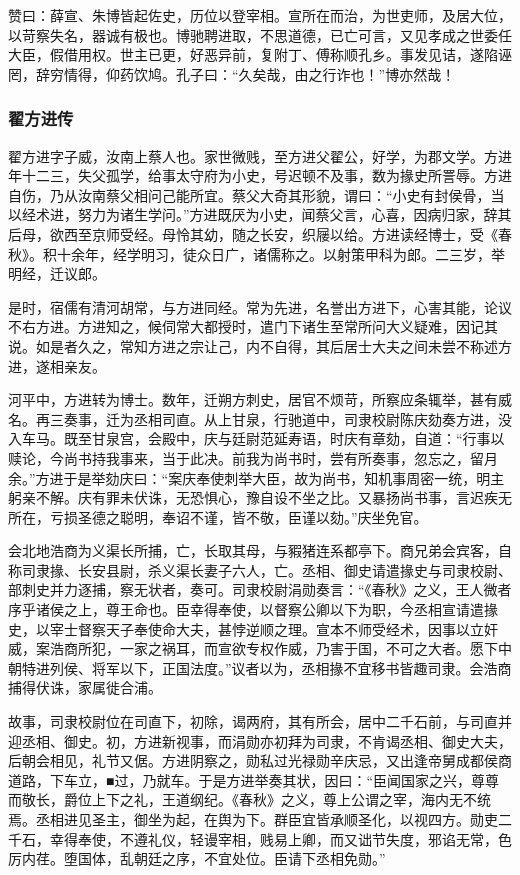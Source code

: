 \documentclass[]{article}
\begin{document}
赞曰：薛宣、朱博皆起佐史，历位以登宰相。宣所在而治，为世吏师，及居大位，以苛察失名，器诚有极也。博驰聘进取，不思道德，已亡可言，又见孝成之世委任大臣，假借用权。世主已更，好恶异前，复附丁、傅称顺孔乡。事发见诘，遂陷诬罔，辞穷情得，仰药饮鸠。孔子曰：``久矣哉，由之行诈也！''博亦然哉！

\hypertarget{header-n5719}{%
\subsubsection{翟方进传}\label{header-n5719}}

翟方进字子威，汝南上蔡人也。家世微贱，至方进父翟公，好学，为郡文学。方进年十二三，失父孤学，给事太守府为小史，号迟顿不及事，数为掾史所詈辱。方进自伤，乃从汝南蔡父相问己能所宜。蔡父大奇其形貌，谓曰：``小史有封侯骨，当以经术进，努力为诸生学问。''方进既厌为小史，闻蔡父言，心喜，因病归家，辞其后母，欲西至京师受经。母怜其幼，随之长安，织屦以给。方进读经博士，受《春秋》。积十余年，经学明习，徒众日广，诸儒称之。以射策甲科为郎。二三岁，举明经，迁议郎。

是时，宿儒有清河胡常，与方进同经。常为先进，名誉出方进下，心害其能，论议不右方进。方进知之，候伺常大都授时，遣门下诸生至常所问大义疑难，因记其说。如是者久之，常知方进之宗让己，内不自得，其后居士大夫之间未尝不称述方进，遂相亲友。

河平中，方进转为博士。数年，迁朔方刺史，居官不烦苛，所察应条辄举，甚有威名。再三奏事，迁为丞相司直。从上甘泉，行驰道中，司隶校尉陈庆劾奏方进，没入车马。既至甘泉宫，会殿中，庆与廷尉范延寿语，时庆有章劾，自道：``行事以赎论，今尚书持我事来，当于此决。前我为尚书时，尝有所奏事，忽忘之，留月余。''方进于是举劾庆曰：``案庆奉使刺举大臣，故为尚书，知机事周密一统，明主躬亲不解。庆有罪未伏诛，无恐惧心，豫自设不坐之比。又暴扬尚书事，言迟疾无所在，亏损圣德之聪明，奉诏不谨，皆不敬，臣谨以劾。''庆坐免官。

会北地浩商为义渠长所捕，亡，长取其母，与豭猪连系都亭下。商兄弟会宾客，自称司隶掾、长安县尉，杀义渠长妻子六人，亡。丞相、御史请遣掾史与司隶校尉、部刺史并力逐捕，察无状者，奏可。司隶校尉涓勋奏言：``《春秋》之义，王人微者序乎诸侯之上，尊王命也。臣幸得奉使，以督察公卿以下为职，今丞相宣请遣掾史，以宰士督察天子奉使命大夫，甚悖逆顺之理。宣本不师受经术，因事以立奸威，案浩商所犯，一家之祸耳，而宣欲专权作威，乃害于国，不可之大者。愿下中朝特进列侯、将军以下，正国法度。''议者以为，丞相掾不宜移书皆趣司隶。会浩商捕得伏诛，家属徙合浦。

故事，司隶校尉位在司直下，初除，谒两府，其有所会，居中二千石前，与司直并迎丞相、御史。初，方进新视事，而涓勋亦初拜为司隶，不肯谒丞相、御史大夫，后朝会相见，礼节又倨。方进阴察之，勋私过光禄勋辛庆忌，又出逢帝舅成都侯商道路，下车立，■过，乃就车。于是方进举奏其状，因曰：``臣闻国家之兴，尊尊而敬长，爵位上下之礼，王道纲纪。《春秋》之义，尊上公谓之宰，海内无不统焉。丞相进见圣主，御坐为起，在舆为下。群臣宜皆承顺圣化，以视四方。勋吏二千石，幸得奉使，不遵礼仪，轻谩宰相，贱易上卿，而又诎节失度，邪谄无常，色厉内荏。堕国体，乱朝廷之序，不宜处位。臣请下丞相免勋。''
\end{document}
